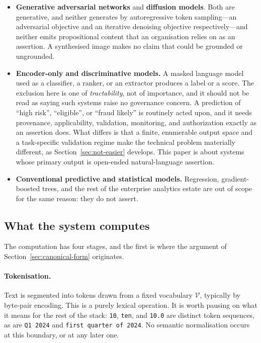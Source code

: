 \begin{itemize}
  \item \textbf{Generative adversarial networks} and \textbf{diffusion models}.
        Both are generative, and neither generates by autoregressive token
        sampling---an adversarial objective and an iterative denoising objective
        respectively---and neither emits propositional content that an
        organisation relies on as an assertion. A synthesised image makes no claim
        that could be grounded or ungrounded.
  \item \textbf{Encoder-only and discriminative models.} A masked language model
        used as a classifier, a ranker, or an extractor produces a label or a score.
        The exclusion here is one of \emph{tractability}, not of importance, and it
        should not be read as saying such systems raise no governance concern. A
        prediction of ``high risk'', ``eligible'', or ``fraud likely'' is routinely
        acted upon, and it needs provenance, applicability, validation, monitoring, and
        authorization exactly as an assertion does. What differs is that a finite,
        enumerable output space and a task-specific validation regime make the
        technical problem materially different, as Section~\ref{sec:not-easier}
        develops. This paper is about systems whose primary output is open-ended
        natural-language assertion.
  \item \textbf{Conventional predictive and statistical models.} Regression,
        gradient-boosted trees, and the rest of the enterprise analytics estate
        are out of scope for the same reason: they do not assert.
\end{itemize}

\subsection{What the system computes}
\label{sec:what-computed}

The computation has four stages, and the first is where the argument of
Section~\ref{sec:canonical-form} originates.

\paragraph{Tokenisation.} Text is segmented into tokens drawn from a fixed
vocabulary $\mathcal{V}$, typically by byte-pair encoding. This is a purely
lexical operation. It is worth pausing on what it means for the rest of the stack:
\texttt{10}, \texttt{ten}, and \texttt{10.0} are distinct token sequences, as are
\texttt{Q1 2024} and \texttt{first quarter of 2024}. No semantic normalisation
occurs at this boundary, or at any later one.

